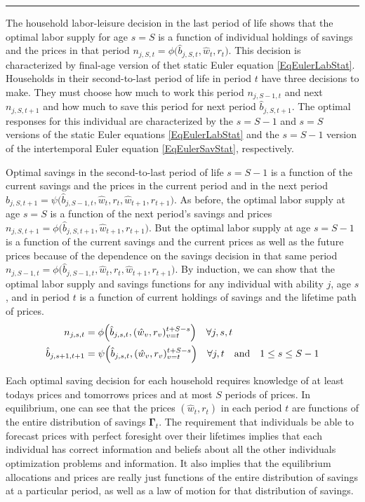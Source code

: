 \documentclass[letterpaper,12pt]{article}
\theoremstyle{definition}
\begin{document}
    \hrule
    \begin{spacing}{1.5}
    \vspace{10mm}

    \noindent The household labor-leisure decision in the last period of life shows that the optimal labor supply for age $s=S$ is a function of individual holdings of savings and the prices in that period $n_{j,S,t}=\phi\bigl(\hat{b}_{j,S,t},\hat{w}_t,r_t\bigr)$. This decision is characterized by final-age version of thet static Euler equation \eqref{EqEulerLabStat}. Households in their second-to-last period of life in period $t$ have three decisions to make. They must choose how much to work this period $n_{j,S-1,t}$ and next $n_{j,S,t+1}$ and how much to save this period for next period $\hat{b}_{j,S,t+1}$. The optimal responses for this individual are characterized by the $s=S-1$ and $s=S$ versions of the static Euler equations \eqref{EqEulerLabStat} and the $s=S-1$ version of the intertemporal Euler equation \eqref{EqEulerSavStat}, respectively.

    Optimal savings in the second-to-last period of life $s=S-1$ is a function of the current savings and the prices in the current period and in the next period $\hat{b}_{j,S,t+1} = \psi\bigl(\hat{b}_{j,S-1,t},\hat{w}_t,r_t,\hat{w}_{t+1},r_{t+1}\bigr)$. As before, the optimal labor supply at age $s=S$ is a function of the next period's savings and prices $n_{j,S,t+1}=\phi\bigl(\hat{b}_{j,S,t+1},\hat{w}_{t+1},r_{t+1}\bigr)$. But the optimal labor supply at age $s=S-1$ is a function of the current savings and the current prices as well as the future prices because of the dependence on the savings decision in that same period $n_{j,S-1,t}=\phi\bigl(\hat{b}_{j,S-1,t},\hat{w}_t,r_t,\hat{w}_{t+1},r_{t+1}\bigr)$. By induction, we can show that the optimal labor supply and savings functions for any individual with ability $j$, age $s$, and in period $t$ is a function of current holdings of savings and the lifetime path of prices.
    \begin{align}
      n_{j,s,t} &= \phi\Bigl(\hat{b}_{j,s,t},(\hat{w}_v,r_v)_{v=t}^{t+S-s}\Bigr) \quad\forall j,s,t \label{EqLabPolFuncGen} \\
      \hat{b}_{j,s+1,t+1} &= \psi\Bigl(\hat{b}_{j,s,t},(\hat{w}_v,r_v)_{v=t}^{t+S-s}\Bigr) \quad\forall j,t \quad\text{and}\quad 1\leq s\leq S-1
    \end{align}

    Each optimal saving decision for each household requires knowledge of at least todays prices and tomorrows prices and at most $S$ periods of prices. In equilibrium, one can see that the prices $(\hat{w}_t,r_t)$ in each period $t$ are functions of the entire distribution of savings $\bm{\Gamma}_t$. The requirement that individuals be able to forecast prices with perfect foresight over their lifetimes implies that each individual has correct information and beliefs about all the other individuals optimization problems and information. It also implies that the equilibrium allocations and prices are really just functions of the entire distribution of savings at a particular period, as well as a law of motion for that distribution of savings.


\end{spacing}
\end{document}
